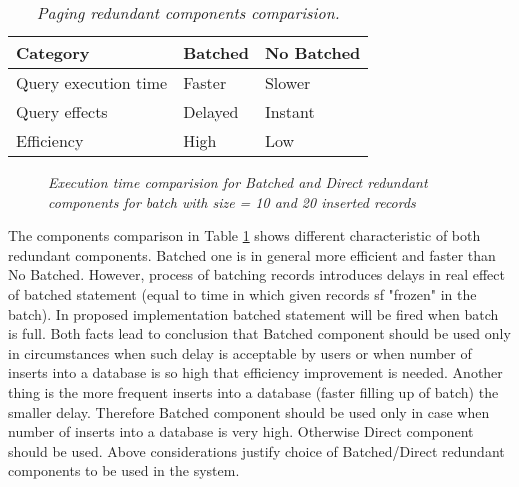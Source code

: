 \documentclass[10pt,a4paper]{article}
\begin{document}
\begin{table}[!htb]
\def\arraystretch{1.5}
\caption{\textit{Paging redundant components comparision.}}\label{batchedcomponents}
\begin{tabularx}{\textwidth}{p{3cm}|X|X}
  \textbf{Category} &\textbf{Batched} & \textbf{No Batched} \\
\hline
Query execution time & Faster & Slower \\
Query effects & Delayed & Instant\\
Efficiency & High & Low\\
\end{tabularx}
\end{table}

\begin{figure}[!htb]
\centering
{}
\caption{\textit{Execution time comparision for Batched and Direct redundant components for batch with size = 10 and 20 inserted records}} \label{fig:batchedtime}
\end{figure}

The components comparison in Table \ref{batchedcomponents} shows different characteristic of both redundant components. Batched one is in general more efficient and faster than No Batched. However, process of batching records introduces delays in real effect of batched statement (equal to time in which given records sf "frozen" in the batch). In proposed implementation batched statement will be fired when batch is full. Both facts lead to conclusion that Batched component should be used only in circumstances when such delay is acceptable by users or when number of inserts into a database is so high that efficiency improvement is needed. Another thing is the more frequent inserts into a database (faster filling up of batch) the smaller delay. Therefore Batched component should be used only in case when number of inserts into a database is very high. Otherwise Direct component should be used. Above considerations justify choice of Batched/Direct redundant components to be used in the system.   
\end{document}
